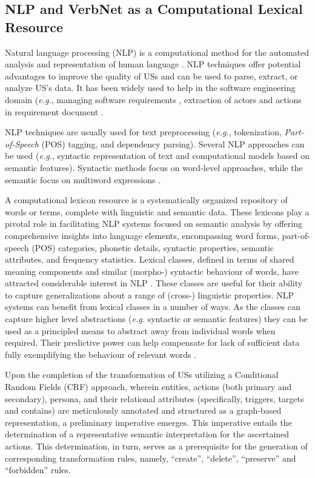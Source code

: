 \subsection{NLP and VerbNet as a Computational Lexical Resource}\label{nlp}
Natural language processing (NLP) is a computational method for the automated analysis and representation of human language \cite{cambria2014jumping}. NLP techniques offer potential advantages to improve the quality of USs and can be used to parse, extract, or analyze US's data. It has been widely used to help in the software engineering domain (\emph{e.g.}, managing software requirements \cite{Arias2018}, extraction of actors and actions in requirement document \cite{al2018use}.

NLP techniques are usually used for text preprocessing (\emph{e.g.}, tokenization, \emph{Part-of-Speech} (POS) tagging, and dependency parsing). Several NLP approaches can be used (\emph{e.g.}, syntactic representation of text and computational models based on semantic features). Syntactic methods focus on word-level approaches, while the semantic focus on multiword expressions \cite{cambria2014jumping}.

A computational lexicon resource is a systematically organized repository of words or terms, complete with linguistic and semantic data. These lexicons play a pivotal role in facilitating NLP systems focused on semantic analysis by offering comprehensive insights into language elements, encompassing word forms, part-of-speech (POS) categories, phonetic details, syntactic properties, semantic attributes, and frequency statistics. Lexical classes, defined in terms of shared meaning components and similar (morpho-) syntactic behaviour of words, have attracted considerable interest in NLP \cite{cambria2014jumping}. These classes are useful for their ability to capture generalizations about a range of (cross-) linguistic properties. NLP systems can benefit from lexical classes in a number of ways. As the classes can capture higher level abstractions (\emph{e.g.} syntactic or semantic features) they can be used as a principled means to abstract away from individual words when required. Their predictive power can help compensate for lack of sufficient data fully exemplifying the behaviour of relevant words \cite{kipper2006extending}.

Upon the completion of the transformation of USs utilizing a Conditional Random Fields (CRF) approach, wherein entities, actions (both primary and secondary), persona, and their relational attributes (specifically, triggers, targets and contains) are meticulously annotated and structured as a graph-based representation, a preliminary imperative emerges. This imperative entails the determination of a representative semantic interpretation for the ascertained actions. This determination, in turn, serves as a prerequisite for the generation of corresponding transformation rules, namely, \enquote{create}, \enquote{delete}, \enquote{preserve} and \enquote{forbidden} rules.

